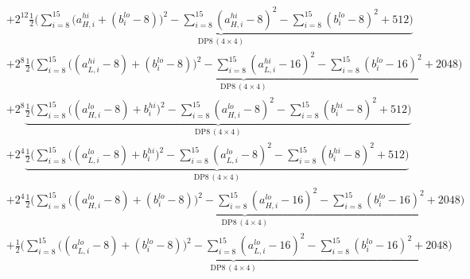 \documentclass[fleqn]{article}
\newcommand{\DPop}[3]{\mathrm{DP#1}\,(#2\!\times\!#3)}
\begin{document}
\begin{align*}
  & + 2^{12}\underbrace{\tfrac12\Big(\sum_{i=8}^{15}\big(a_{H,i}^{hi}{+}(b_i^{lo}{-}8)\big)^2 - \sum_{i=8}^{15}(a_{H,i}^{hi}{-}8)^2 - \sum_{i=8}^{15}(b_i^{lo}{-}8)^2 + 512\Big)}_{\DPop{8}{4}{4}} \\[0.4em]
  & + 2^{8}\underbrace{\tfrac12\Big(\sum_{i=8}^{15}\big((a_{L,i}^{hi}{-}8){+}(b_i^{lo}{-}8)\big)^2 - \sum_{i=8}^{15}(a_{L,i}^{hi}{-}16)^2 - \sum_{i=8}^{15}(b_i^{lo}{-}16)^2 + 2048\Big)}_{\DPop{8}{4}{4}} \\[0.4em]
  & + 2^{8}\underbrace{\tfrac12\Big(\sum_{i=8}^{15}\big((a_{H,i}^{lo}{-}8){+}b_i^{hi}\big)^2 - \sum_{i=8}^{15}(a_{H,i}^{lo}{-}8)^2 - \sum_{i=8}^{15}(b_i^{hi}{-}8)^2 + 512\Big)}_{\DPop{8}{4}{4}} \\[0.4em]
  & + 2^{4}\underbrace{\tfrac12\Big(\sum_{i=8}^{15}\big((a_{L,i}^{lo}{-}8){+}b_i^{hi}\big)^2 - \sum_{i=8}^{15}(a_{L,i}^{lo}{-}8)^2 - \sum_{i=8}^{15}(b_i^{hi}{-}8)^2 + 512\Big)}_{\DPop{8}{4}{4}} \\[0.4em]
  & + 2^{4}\underbrace{\tfrac12\Big(\sum_{i=8}^{15}\big((a_{H,i}^{lo}{-}8){+}(b_i^{lo}{-}8)\big)^2 - \sum_{i=8}^{15}(a_{H,i}^{lo}{-}16)^2 - \sum_{i=8}^{15}(b_i^{lo}{-}16)^2 + 2048\Big)}_{\DPop{8}{4}{4}} \\[0.4em]
  & + \underbrace{\tfrac12\Big(\sum_{i=8}^{15}\big((a_{L,i}^{lo}{-}8){+}(b_i^{lo}{-}8)\big)^2 - \sum_{i=8}^{15}(a_{L,i}^{lo}{-}16)^2 - \sum_{i=8}^{15}(b_i^{lo}{-}16)^2 + 2048\Big)}_{\DPop{8}{4}{4}}
\end{align*}
\end{document}
